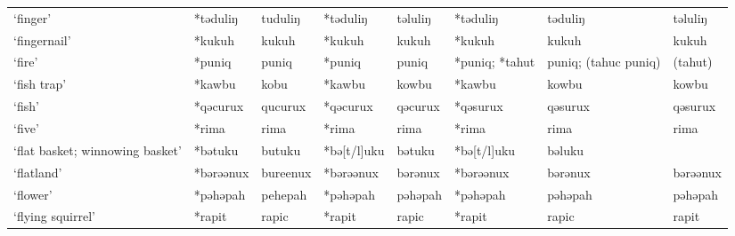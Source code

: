 \begin{landscape}
\begin{longtable}[c]{@{}p{3cm}<{\raggedright}p{2.75cm}<{\raggedright}p{2.75cm}<{\raggedright}p{2.75cm}<{\raggedright}p{2.75cm}<{\raggedright}p{2.75cm}<{\raggedright}p{2.75cm}<{\raggedright}p{2.75cm}<{\raggedright}@{}}
`finger'                                             & *təduliŋ     & tuduliŋ                       & *təduliŋ       & təluliŋ                    & *təduliŋ         & təduliŋ                  & təluliŋ                           \\
`fingernail'                                         & *kukuh       & kukuh                         & *kukuh         & kukuh                      & *kukuh           & kukuh                    & kukuh                             \\
`fire'                                               & *puniq       & puniq                         & *puniq         & puniq                      & *puniq; *tahut   & puniq; (tahuc puniq)     & (tahut)                           \\
`fish trap'                                          & *kawbu       & kobu                          & *kawbu         & kowbu                      & *kawbu           & kowbu                    & kowbu                             \\
`fish'                                               & *qəcurux     & qucurux                       & *qəcurux       & qəcurux                    & *qəsurux         & qəsurux                  & qəsurux                           \\
`five'                                               & *rima        & rima                          & *rima          & rima                       & *rima            & rima                     & rima                              \\
`flat basket; winnowing basket'                      & *bətuku      & butuku                        & *bə[t/l]uku    & bətuku                     & *bə[t/l]uku      & bəluku                   &                                   \\
`flatland'                                           & *bərəənux    & bureenux                      & *bərəənux      & bərənux                    & *bərəənux        & bərənux                  & bərəənux                          \\
`flower'                                             & *pəhəpah     & pehepah                       & *pəhəpah       & pəhəpah                    & *pəhəpah         & pəhəpah                  & pəhəpah                           \\
`flying squirrel'                                    & *rapit       & rapic                         & *rapit         & rapic                      & *rapit           & rapic                    & rapit                             \\

\end{longtable}
\end{landscape}
